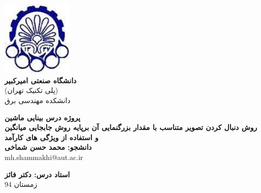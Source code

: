 \documentclass[paper=a4, fontsize=12pt]{article} %
\begin{document}
\begin{titlepage}
\begin{center}

\includegraphics[width=3.38cm]{amirkabir.jpg}\\[5pt]
{\Large\bfseries 
دانشگاه صنعتی امیرکبیر
}\\
\linespread{1}
{\Large
(پلی تکنیک تهران)
}\\
{\LARGE
دانشکده مهندسی برق
}\\
 \vspace{1.5cm}

 {\LARGE\bfseries
پروژه درس بینایی ماشین
 }\\
 \vspace{1.5cm}
{\huge\bfseries 
روش دنبال کردن تصویر متناسب با مقدار بزرگنمایی آن برپایه روش جابجایی میانگین
\\
و استفاده از ویژگی های کارآمد
\\}
 \vspace{1.5cm}
 {\Large\bfseries
دانشجو: محمد حسن شماخی 
 }\\

 mh.shammakhi@aut.ac.ir\\[14pt]
 \vspace{1cm}

 {\Large\bfseries
استاد درس: دکتر فائز
 }\\
 \vfill
{
زمستان 94
}		
              
\end{center}
\end{titlepage}






\tableofcontents
\newpage
\end{document}
